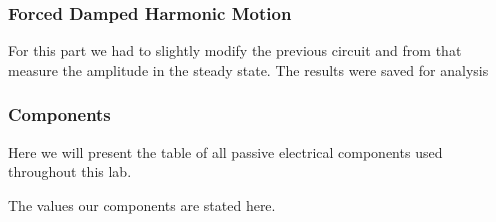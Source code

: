 \subsubsection{Forced Damped Harmonic Motion}
For this part we had to slightly modify the previous circuit and from that measure the amplitude in the steady state. The results were saved for analysis

\subsubsection{Components}

Here we will present the table of all passive electrical components used throughout this lab.

\begin{table}[h]

  \footnotesize{
        
        
    }
\caption{The values our components are stated here.}%
\label{tab:components}
\end{table}
